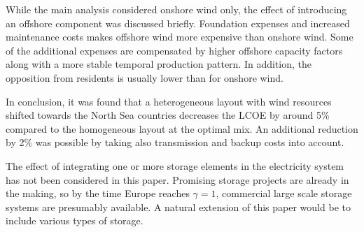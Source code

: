 \documentclass[a4paper, 12pt, sort&compress]{elsarticle}%
\begin{document}
While the main analysis considered onshore wind only, the effect of
introducing an offshore component was discussed briefly. Foundation
expenses and increased maintenance costs makes offshore wind more
expensive than onshore wind. Some of the additional expenses are
compensated by higher offshore capacity factors along with a more
stable temporal production pattern. In addition, the opposition from
residents is usually lower than for onshore wind.

In conclusion, it was found that a heterogeneous layout with wind
resources shifted towards the North Sea countries decreases the LCOE
by around 5\% compared to the homogeneous layout at the optimal mix. An
additional reduction by 2\% was possible by taking also transmission
and backup costs into account. \newline

The effect of integrating one or more storage elements in the
electricity system has not been considered in this paper. Promising
storage projects are already in the making, so by the time Europe reaches
$\gamma = 1$, commercial large scale storage systems are presumably
available. A natural extension of this paper would be to include
various types of storage.




\end{document}

